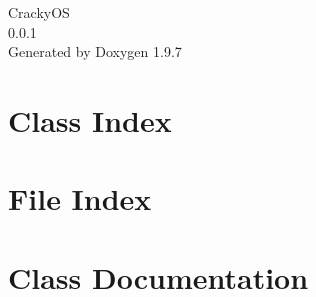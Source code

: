 \documentclass[twoside]{book}
\newcommand{\+}{\discretionary{\mbox{\scriptsize$\hookleftarrow$}}{}{}}
\newcommand{\clearemptydoublepage}{%
    \newpage{\pagestyle{empty}\cleardoublepage}%
  }
\begin{document}
  \raggedbottom
    \hypersetup{pageanchor=false,
                bookmarksnumbered=true,
                pdfencoding=unicode
               }
  \begin{titlepage}
  \vspace*{7cm}
  \begin{center}%
  {\Large Cracky\+OS}\\
  [1ex]\large 0.\+0.\+1 \\
  \vspace*{1cm}
  {\large Generated by Doxygen 1.9.7}\\
  \end{center}
  \end{titlepage}
  \clearemptydoublepage
  \tableofcontents
  \clearemptydoublepage
  \hypersetup{pageanchor=true}








\chapter{Class Index}

\chapter{File Index}

\chapter{Class Documentation}



























\end{document}
